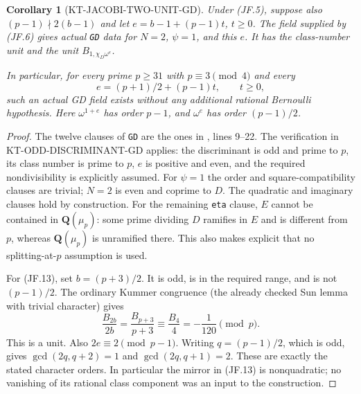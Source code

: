 \documentclass[11pt,a4paper]{article}
\newtheorem{corollary}[theorem]{Corollary}
\theoremstyle{definition}
\begin{document}
\begin{corollary}[KT-JACOBI-TWO-UNIT-GD]
Under (JF.5), suppose also $(p-1)\nmid2(b-1)$ and let
$e=b-1+(p-1)t$, $t\geq0$.  The field supplied by (JF.6) gives
actual \texttt{GD} data for $N=2$, $\psi=1$, and this $e$.
It has the class-number unit and the unit
$B_{1,\chi_D\omega^e}$.

In particular, for every prime $p\geq31$ with $p\equiv3\pmod4$
and every
\[
                      e=(p+1)/2+(p-1)t,\qquad t\geq0,    \tag{JF.13}
\]
such an actual GD field exists without any additional rational
Bernoulli hypothesis.  Here $\omega^{1+e}$ has order $p-1$,
and $\omega^e$ has order $(p-1)/2$.
\end{corollary}
\begin{proof}
The twelve clauses of \texttt{GD} are the ones in
, lines 9--22.  The verification in
KT-ODD-DISCRIMINANT-GD applies: the discriminant is odd and
prime to $p$, its class number is prime to $p$, $e$ is positive
and even, and the required nondivisibility is explicitly assumed.
For $\psi=1$ the order and square-compatibility clauses are trivial;
$N=2$ is even and coprime to $D$.  The quadratic and imaginary
clauses hold by construction.  For the remaining \texttt{eta}
clause, $E$ cannot be contained in $\mathbf Q(\mu_p)$: some
prime dividing $D$ ramifies in $E$ and is different from $p$,
whereas $\mathbf Q(\mu_p)$ is unramified there.  This also makes
explicit that no splitting-at-$p$ assumption is used.

For (JF.13), set $b=(p+3)/2$.  It is odd, is in the required
range, and is not $(p-1)/2$.  The ordinary Kummer congruence
(the already checked Sun lemma with trivial character) gives
\[
 \frac{B_{2b}}{2b}=\frac{B_{p+3}}{p+3}
       \equiv\frac{B_4}{4}=-\frac1{120}\pmod p.          \tag{JF.14}
\]
This is a unit.  Also $2e\equiv2\pmod{p-1}$.
Writing $q=(p-1)/2$, which is odd, gives
$\gcd(2q,q+2)=1$ and $\gcd(2q,q+1)=2$.
These are exactly the stated character orders.  In particular
the mirror in (JF.13) is nonquadratic; no vanishing of its
rational class component was an input to the construction.
\end{proof}
\end{document}
